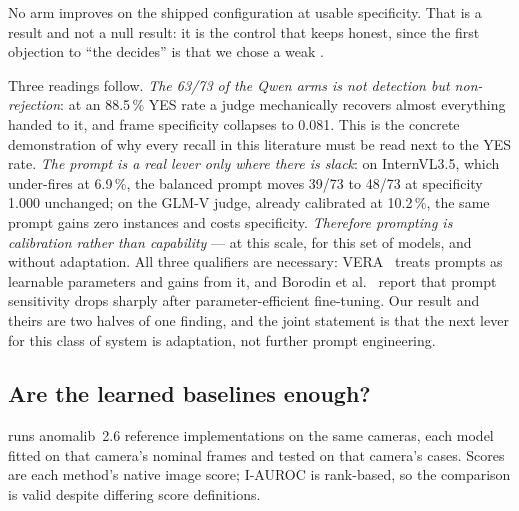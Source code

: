 No arm improves on the shipped configuration at usable specificity. That is a
result and not a null result: it is the control that keeps
 honest, since the first objection to ``the
\proposer{} decides'' is that we chose a weak \judge{}.

Three readings follow. \emph{The 63/73 of the Qwen arms is not detection but
non-rejection}: at an 88.5\,\% YES rate a judge mechanically recovers almost
everything handed to it, and frame specificity collapses to 0.081. This is the
concrete demonstration of why every recall in this literature must be read next
to the YES rate. \emph{The prompt is a real lever only where there is slack}: on
InternVL3.5, which under-fires at 6.9\,\%, the balanced prompt moves 39/73 to
48/73 at specificity 1.000 unchanged; on the GLM-V judge, already calibrated at
10.2\,\%, the same prompt gains zero instances and costs specificity.
\emph{Therefore prompting is calibration rather than capability} --- at this
scale, for this set of models, and without adaptation. All three qualifiers are
necessary: VERA~\cite{Ye_2025} treats prompts as learnable parameters and gains
from it, and Borodin et al.~\cite{Borodin_2025} report that prompt sensitivity
drops sharply after parameter-efficient fine-tuning. Our result and theirs are
two halves of one finding, and the joint statement is that the next lever for
this class of system is adaptation, not further prompt engineering.

\subsection{Are the learned baselines enough?}
\label{sec:results:baselines}

 runs anomalib~2.6 reference implementations on the same
cameras, each model fitted on that camera's nominal frames and tested on that
camera's cases. Scores are each method's native image score; I-AUROC is
rank-based, so the comparison is valid despite differing score definitions.

